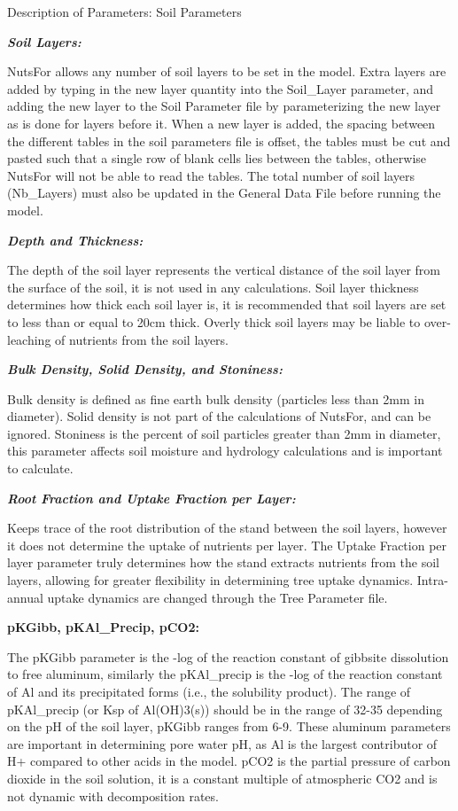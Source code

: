 \documentclass[
]{article}
\begin{document}
Description of Parameters: Soil Parameters

\textbf{\emph{Soil Layers:}}

NutsFor allows any number of soil layers to be set in the model. Extra
layers are added by typing in the new layer quantity into the
Soil\_Layer parameter, and adding the new layer to the Soil Parameter
file by parameterizing the new layer as is done for layers before it.
When a new layer is added, the spacing between the different tables in
the soil parameters file is offset, the tables must be cut and pasted
such that a single row of blank cells lies between the tables, otherwise
NutsFor will not be able to read the tables. The total number of soil
layers (Nb\_Layers) must also be updated in the General Data File before
running the model.

\textbf{\emph{Depth and Thickness:}}

The depth of the soil layer represents the vertical distance of the soil
layer from the surface of the soil, it is not used in any calculations.
Soil layer thickness determines how thick each soil layer is, it is
recommended that soil layers are set to less than or equal to 20cm
thick. Overly thick soil layers may be liable to over-leaching of
nutrients from the soil layers.

\textbf{\emph{Bulk Density, Solid Density, and Stoniness:}}

Bulk density is defined as fine earth bulk density (particles less than
2mm in diameter). Solid density is not part of the calculations of
NutsFor, and can be ignored. Stoniness is the percent of soil particles
greater than 2mm in diameter, this parameter affects soil moisture and
hydrology calculations and is important to calculate.

\textbf{\emph{Root Fraction and Uptake Fraction per Layer:}}

Keeps trace of the root distribution of the stand between the soil
layers, however it does not determine the uptake of nutrients per layer.
The Uptake Fraction per layer parameter truly determines how the stand
extracts nutrients from the soil layers, allowing for greater
flexibility in determining tree uptake dynamics. Intra-annual uptake
dynamics are changed through the Tree Parameter file.

\textbf{pKGibb, pKAl\_Precip, pCO2:}

The pKGibb parameter is the -log of the reaction constant of gibbsite
dissolution to free aluminum, similarly the pKAl\_precip is the -log of
the reaction constant of Al and its precipitated forms (i.e., the
solubility product). The range of pKAl\_precip (or Ksp of Al(OH)3(s))
should be in the range of 32-35 depending on the pH of the soil layer,
pKGibb ranges from 6-9. These aluminum parameters are important in
determining pore water pH, as Al is the largest contributor of H+
compared to other acids in the model. pCO2 is the partial pressure of
carbon dioxide in the soil solution, it is a constant multiple of
atmospheric CO2 and is not dynamic with decomposition rates.
\end{document}
